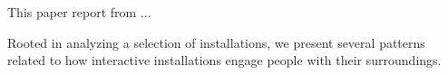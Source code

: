 

This paper report from ...

Rooted in analyzing a selection of installations, we present several patterns related to how interactive installations engage people with their surroundings. 